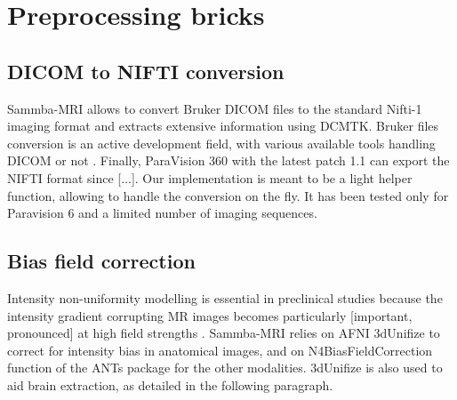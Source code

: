 \documentclass[utf8, a4paper, final, crop]{frontiersSCNS} %
\begin{document}
\section{Preprocessing bricks}

\subsection{DICOM to NIFTI conversion}

Sammba-MRI allows to convert Bruker DICOM files to the standard Nifti-1 
imaging format and extracts extensive information using DCMTK. 
Bruker files conversion is an active development field,
with various available tools handling DICOM \citeauthor{dicomifier} or
not \citeauthor{bru2nii, bruker2nifti}.
Finally, ParaVision 360 with the latest patch 1.1 can export the NIFTI format since [...].
Our implementation is meant to be a light helper function, allowing to 
handle the conversion on the fly. It has been tested only for Paravision 6
and a limited number of imaging sequences.

\subsection{Bias field correction}

Intensity non-uniformity modelling is essential in preclinical studies
because the intensity gradient corrupting MR images becomes
particularly [important, pronounced] at high field strengths \citep{boyes2008intensity}.
Sammba-MRI relies on AFNI 3dUnifize to correct for intensity bias in
anatomical images, and on N4BiasFieldCorrection function
of the ANTs package \citep{tustison2010n4itk}
for the other modalities. 3dUnifize is also used to aid brain extraction,
as detailed in the following paragraph.
\end{document}
